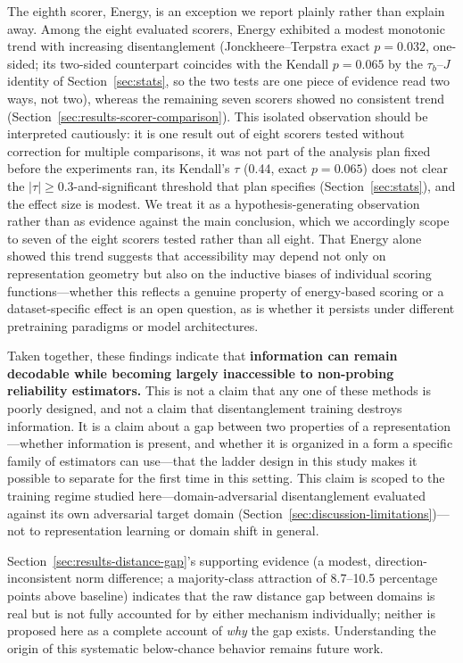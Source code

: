 The eighth scorer, Energy, is an exception we report plainly rather than explain away. Among the eight evaluated scorers, Energy exhibited a modest monotonic trend with increasing disentanglement (Jonckheere--Terpstra exact $p=0.032$, one-sided; its two-sided counterpart coincides with the Kendall $p=0.065$ by the $\tau_b$--$J$ identity of Section~\ref{sec:stats}, so the two tests are one piece of evidence read two ways, not two), whereas the remaining seven scorers showed no consistent trend (Section~\ref{sec:results-scorer-comparison}). This isolated observation should be interpreted cautiously: it is one result out of eight scorers tested without correction for multiple comparisons, it was not part of the analysis plan fixed before the experiments ran, its Kendall's $\tau$ (0.44, exact $p=0.065$) does not clear the $|\tau|\geq0.3$-and-significant threshold that plan specifies (Section~\ref{sec:stats}), and the effect size is modest. We treat it as a hypothesis-generating observation rather than as evidence against the main conclusion, which we accordingly scope to seven of the eight scorers tested rather than all eight. That Energy alone showed this trend suggests that accessibility may depend not only on representation geometry but also on the inductive biases of individual scoring functions---whether this reflects a genuine property of energy-based scoring or a dataset-specific effect is an open question, as is whether it persists under different pretraining paradigms or model architectures.

Taken together, these findings indicate that \textbf{information can remain decodable while becoming largely inaccessible to non-probing reliability estimators.} This is not a claim that any one of these methods is poorly designed, and not a claim that disentanglement training destroys information. It is a claim about a gap between two properties of a representation---whether information is present, and whether it is organized in a form a specific family of estimators can use---that the ladder design in this study makes it possible to separate for the first time in this setting. This claim is scoped to the training regime studied here---domain-adversarial disentanglement evaluated against its own adversarial target domain (Section~\ref{sec:discussion-limitations})---not to representation learning or domain shift in general.

Section~\ref{sec:results-distance-gap}'s supporting evidence (a modest, direction-inconsistent norm difference; a majority-class attraction of 8.7--10.5 percentage points above baseline) indicates that the raw distance gap between domains is real but is not fully accounted for by either mechanism individually; neither is proposed here as a complete account of \emph{why} the gap exists. Understanding the origin of this systematic below-chance behavior remains future work.

